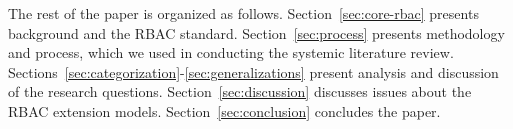 The rest of the paper is organized as follows. 
Section~\ref{sec:core-rbac} presents background and the RBAC standard. 
Section~\ref{sec:process} presents methodology and process, which we used in conducting the systemic literature review. 
Sections~\ref{sec:categorization}-\ref{sec:generalizations} present analysis and discussion of the research questions. 
Section~\ref{sec:discussion} discusses issues about the RBAC extension models.
Section~\ref{sec:conclusion} concludes the paper.
